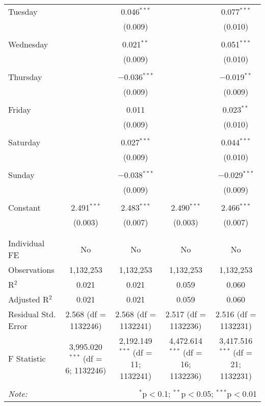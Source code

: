 \documentclass[
]{article}
\begin{document}
\begin{table}[!htbp]
{\begin{tabular}{@{\extracolsep{5pt}}lcccc}
 Tuesday &  & 0.046$^{***}$ &  & 0.077$^{***}$ \\ 
  &  & (0.009) &  & (0.010) \\ 
  & & & & \\ 
 Wednesday &  & 0.021$^{**}$ &  & 0.051$^{***}$ \\ 
  &  & (0.009) &  & (0.010) \\ 
  & & & & \\ 
 Thursday &  & $-$0.036$^{***}$ &  & $-$0.019$^{**}$ \\ 
  &  & (0.009) &  & (0.009) \\ 
  & & & & \\ 
 Friday &  & 0.011 &  & 0.023$^{**}$ \\ 
  &  & (0.009) &  & (0.010) \\ 
  & & & & \\ 
 Saturday &  & 0.027$^{***}$ &  & 0.044$^{***}$ \\ 
  &  & (0.009) &  & (0.010) \\ 
  & & & & \\ 
 Sunday &  & $-$0.038$^{***}$ &  & $-$0.029$^{***}$ \\ 
  &  & (0.009) &  & (0.009) \\ 
  & & & & \\ 
 Constant & 2.491$^{***}$ & 2.483$^{***}$ & 2.490$^{***}$ & 2.466$^{***}$ \\ 
  & (0.003) & (0.007) & (0.003) & (0.007) \\ 
  & & & & \\ 
\hline \\[-1.8ex] 
Individual FE & No & No & No & No \\ 
Observations & 1,132,253 & 1,132,253 & 1,132,253 & 1,132,253 \\ 
R$^{2}$ & 0.021 & 0.021 & 0.059 & 0.060 \\ 
Adjusted R$^{2}$ & 0.021 & 0.021 & 0.059 & 0.060 \\ 
Residual Std. Error & 2.568 (df = 1132246) & 2.568 (df = 1132241) & 2.517 (df = 1132236) & 2.516 (df = 1132231) \\ 
F Statistic & 3,995.020$^{***}$ (df = 6; 1132246) & 2,192.149$^{***}$ (df = 11; 1132241) & 4,472.614$^{***}$ (df = 16; 1132236) & 3,417.516$^{***}$ (df = 21; 1132231) \\ 
\hline 
\hline \\[-1.8ex] 
\textit{Note:}  & \multicolumn{4}{r}{$^{*}$p$<$0.1; $^{**}$p$<$0.05; $^{***}$p$<$0.01} \\ 
\end{tabular}
} 
\end{table} 
\newpage
\end{document}
